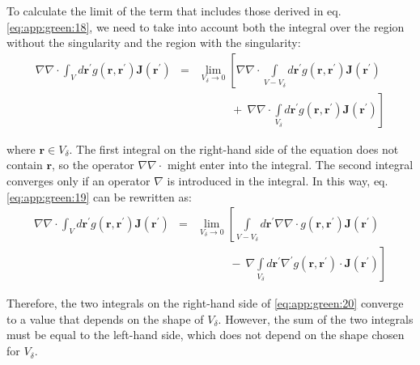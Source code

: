 			To calculate the limit of the term that includes those derived in eq.\eqref{eq:app:green:18}, we need to take into account both the integral over the region without the singularity and the region with the singularity:
			\begin{eqnarray}
				\nabla\nabla\cdot\int_V d\mathbf{r^\prime} g(\mathbf{r},\mathbf{r^\prime})\mathbf{J}(\mathbf{r^\prime}) &=& \lim\limits_{V_\delta\rightarrow0} \left[\nabla\nabla\cdot\int\limits_{V-V_\delta} d\mathbf{r^\prime} g(\mathbf{r},\mathbf{r^\prime})\mathbf{J}(\mathbf{r^\prime})\right.\nonumber \\ &&\left.~~~~~~~~~~~~~+~\nabla\nabla\cdot\int\limits_{V_\delta} d\mathbf{r^\prime} g(\mathbf{r},\mathbf{r^\prime})\mathbf{J}(\mathbf{r^\prime})\right] \label{eq:app:green:19}
			\end{eqnarray}
		
			\noindent where $\mathbf{r}\in V_{\delta}$. The first integral on the right-hand side of the equation does not contain $\mathbf{r}$, so the operator $\nabla\nabla\cdot$ might enter into the integral. The second integral converges only if an operator $\nabla$ is introduced in the integral. In this way, eq.\eqref{eq:app:green:19} can be rewritten as:
			\begin{eqnarray}
				\nabla\nabla\cdot\int_V d\mathbf{r^\prime} g(\mathbf{r},\mathbf{r^\prime})\mathbf{J}(\mathbf{r^\prime}) &=& \lim\limits_{V_\delta\rightarrow0} \left[\int\limits_{V-V_\delta} d\mathbf{r^\prime} \nabla\nabla\cdot g(\mathbf{r},\mathbf{r^\prime})\mathbf{J}(\mathbf{r^\prime})\right.\nonumber \\ &&\left.~~~~~~~~~~~~~-~\nabla\int\limits_{V_\delta} d\mathbf{r^\prime} \nabla^\prime g(\mathbf{r},\mathbf{r^\prime})\cdot\mathbf{J}(\mathbf{r^\prime})\right] \label{eq:app:green:20}
			\end{eqnarray}
		
			Therefore, the two integrals on the right-hand side of \eqref{eq:app:green:20} converge to a value that depends on the shape of $V_\delta$. However, the sum of the two integrals must be equal to the left-hand side, which does not depend on the shape chosen for $V_\delta$.
			
